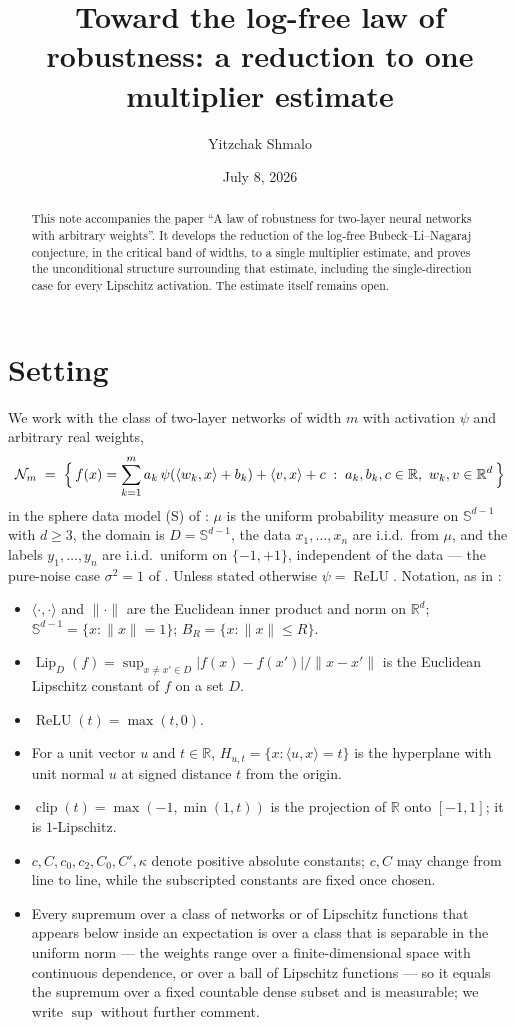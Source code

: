 \documentclass[11pt,reqno]{amsart}
\title[Toward the log-free law of robustness]{Toward the log-free law of robustness: a reduction to one multiplier estimate}
\author{Yitzchak Shmalo}
\date{July 8, 2026}
\theoremstyle{plain}
\theoremstyle{definition}
\theoremstyle{remark}
\newcommand{\R}{\mathbb{R}}
\newcommand{\Sd}{\mathbb{S}^{d-1}}
\newcommand{\Lip}{\operatorname{Lip}}
\newcommand{\relu}{\operatorname{ReLU}}
\newcommand{\NN}{\mathcal{N}}
\newcommand{\inn}[2]{\langle #1,#2\rangle}
\DeclareMathOperator{\clip}{clip}
\begin{document}
\begin{abstract}
This note accompanies the paper ``A law of robustness for two-layer neural networks with arbitrary weights''. It develops the reduction of the log-free Bubeck--Li--Nagaraj conjecture, in the critical band of widths, to a single multiplier estimate, and proves the unconditional structure surrounding that estimate, including the single-direction case for every Lipschitz activation. The estimate itself remains open.
\end{abstract}

\maketitle

\section{Setting}\label{sec:setting}

We work with the class of two-layer networks of width $m$ with activation $\psi$ and arbitrary real weights,
\begin{equation}\label{eq:class}
\NN_m \;=\;\Bigl\{\,f(x)=\sum_{k=1}^{m}a_k\,\psi(\inn{w_k}{x}+b_k)+\inn{v}{x}+c\;:\;a_k,b_k,c\in\R,\ w_k,v\in\R^d\,\Bigr\}
\end{equation}
in the sphere data model (S) of \cite{BLN,paper}: $\mu$ is the uniform probability measure on $\Sd$ with $d\ge3$, the domain is $D=\Sd$, the data $x_1,\dots,x_n$ are i.i.d.\ from $\mu$, and the labels $y_1,\dots,y_n$ are i.i.d.\ uniform on $\{-1,+1\}$, independent of the data --- the pure-noise case $\sigma^2=1$ of \cite{paper}. Unless stated otherwise $\psi=\relu$. Notation, as in \cite{paper}:
\begin{itemize}
\item $\inn{\cdot}{\cdot}$ and $\|\cdot\|$ are the Euclidean inner product and norm on $\R^d$; $\mathbb S^{d-1}=\{x:\|x\|=1\}$; $B_R=\{x:\|x\|\le R\}$.
\item $\Lip_D(f)=\sup_{x\ne x'\in D}|f(x)-f(x')|/\|x-x'\|$ is the Euclidean Lipschitz constant of $f$ on a set $D$.
\item $\relu(t)=\max(t,0)$.
\item For a unit vector $u$ and $t\in\R$, $H_{u,t}=\{x:\inn{u}{x}=t\}$ is the hyperplane with unit normal $u$ at signed distance $t$ from the origin.
\item $\clip(t)=\max(-1,\min(1,t))$ is the projection of $\R$ onto $[-1,1]$; it is $1$-Lipschitz.
\item $c,C,c_0,c_2,C_0,C',\kappa$ denote positive absolute constants; $c,C$ may change from line to line, while the subscripted constants are fixed once chosen.
\item Every supremum over a class of networks or of Lipschitz functions that appears below inside an expectation is over a class that is separable in the uniform norm --- the weights range over a finite-dimensional space with continuous dependence, or over a ball of Lipschitz functions --- so it equals the supremum over a fixed countable dense subset and is measurable; we write $\sup$ without further comment.
\end{itemize}
\end{document}
